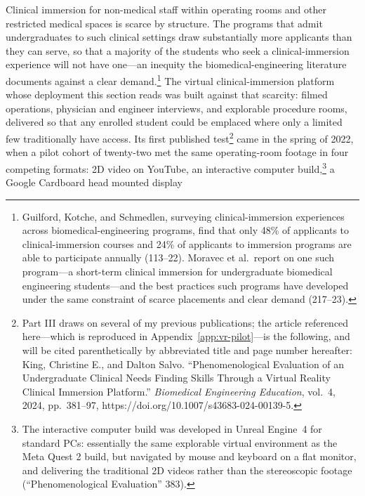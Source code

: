 Clinical immersion for non-medical staff within operating rooms and other
restricted medical spaces is scarce by structure. The programs that admit
undergraduates to such clinical settings draw substantially more applicants than
they can serve, so that a majority of the students who seek a clinical-immersion
experience will not have one---an inequity the biomedical-engineering literature
documents against a clear demand.\footnote{Guilford, Kotche, and Schmedlen,
surveying clinical-immersion experiences across biomedical-engineering programs,
find that only 48\% of applicants to clinical-immersion courses and 24\% of
applicants to immersion programs are able to participate annually (113--22).
Moravec et al.\ report on one such program---a short-term clinical immersion for
undergraduate biomedical engineering students---and the best practices such
programs have developed under the same constraint of scarce placements and clear
demand (217--23).} The virtual clinical-immersion
platform whose deployment this section reads was built against that scarcity:
filmed operations, physician and engineer interviews, and explorable procedure
rooms, delivered so that any enrolled student could be emplaced where only a
limited few traditionally have access. Its first published
test\footnote{Part III draws on several of my previous publications; the article
referenced here---which is reproduced in Appendix~\ref{app:vr-pilot}---is the
following, and will be cited parenthetically by abbreviated title and page number
hereafter: King, Christine E., and Dalton Salvo. ``Phenomenological Evaluation of
an Undergraduate Clinical Needs Finding Skills Through a Virtual Reality Clinical
Immersion Platform.'' \textit{Biomedical Engineering Education}, vol.~4, 2024,
pp.~381--97, https://doi.org/10.1007/s43683-024-00139-5.} came in the spring of
2022, when a pilot cohort of twenty-two met the same operating-room footage in
four competing formats: 2D video on YouTube, an interactive computer
build,\footnote{The interactive computer build was developed in Unreal Engine~4
for standard PCs: essentially the same explorable virtual environment as the
Meta Quest 2 build, but navigated by mouse and keyboard on a flat monitor, and
delivering the traditional 2D videos rather than the stereoscopic footage
(``Phenomenological Evaluation'' 383).} a Google Cardboard head mounted display
